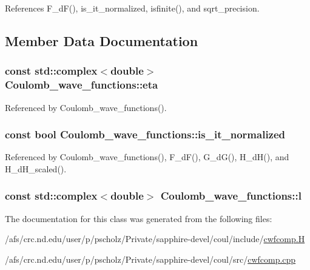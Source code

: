 References F\-\_\-d\-F(), is\-\_\-it\-\_\-normalized, isfinite(), and sqrt\-\_\-precision.



\subsection{Member Data Documentation}
\hypertarget{classCoulomb__wave__functions_a944d6723016c4c50ad7a9b55d62a0131}{
\subsubsection[{eta}]{\setlength{\rightskip}{0pt plus 5cm}const {\bf std\-::complex}$<$double$>$ Coulomb\-\_\-wave\-\_\-functions\-::eta}}\label{classCoulomb__wave__functions_a944d6723016c4c50ad7a9b55d62a0131}


Referenced by Coulomb\-\_\-wave\-\_\-functions().

\hypertarget{classCoulomb__wave__functions_a11b791087220f0194b2750d36946392e}{
\subsubsection[{is\-\_\-it\-\_\-normalized}]{\setlength{\rightskip}{0pt plus 5cm}const bool Coulomb\-\_\-wave\-\_\-functions\-::is\-\_\-it\-\_\-normalized}}\label{classCoulomb__wave__functions_a11b791087220f0194b2750d36946392e}


Referenced by Coulomb\-\_\-wave\-\_\-functions(), F\-\_\-d\-F(), G\-\_\-d\-G(), H\-\_\-d\-H(), and H\-\_\-d\-H\-\_\-scaled().

\hypertarget{classCoulomb__wave__functions_a184f08ca7adeb5d334b72dc354777a64}{
\subsubsection[{l}]{\setlength{\rightskip}{0pt plus 5cm}const {\bf std\-::complex}$<$double$>$ Coulomb\-\_\-wave\-\_\-functions\-::l}}\label{classCoulomb__wave__functions_a184f08ca7adeb5d334b72dc354777a64}


The documentation for this class was generated from the following files\-:\begin{DoxyCompactItemize}
\item 
/afs/crc.\-nd.\-edu/user/p/pscholz/\-Private/sapphire-\/devel/coul/include/\hyperlink{cwfcomp_8H}{cwfcomp.\-H}\item 
/afs/crc.\-nd.\-edu/user/p/pscholz/\-Private/sapphire-\/devel/coul/src/\hyperlink{cwfcomp_8cpp}{cwfcomp.\-cpp}\end{DoxyCompactItemize}
